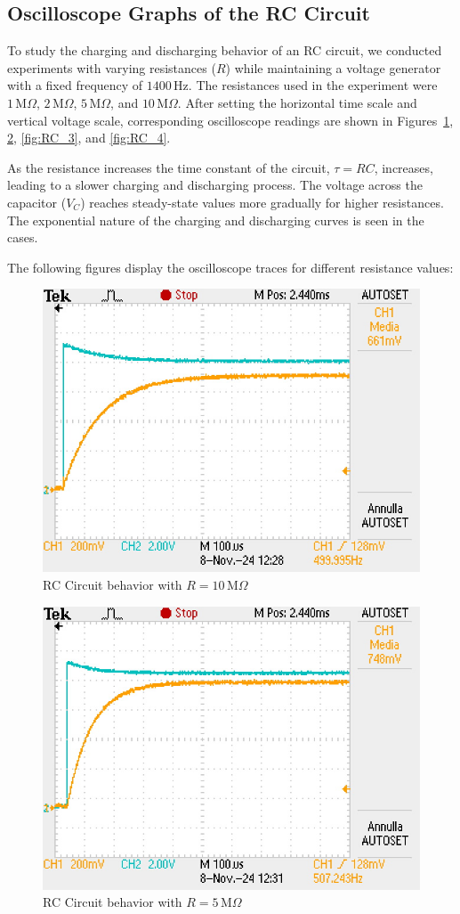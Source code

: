 \documentclass[notitlepage]{report}
\numberwithin{equation}{section}
\theoremstyle{plain}
\theoremstyle{definition}
\theoremstyle{remark}
\begin{document}
\subsection{Oscilloscope Graphs of the RC Circuit}

To study the charging and discharging behavior of an RC circuit, we conducted experiments with varying resistances (\(R\)) while maintaining a voltage generator with a fixed frequency of \(1400 \, \text{Hz}\). The resistances used in the experiment were \(1 \, \text{M}\Omega\), \(2 \, \text{M}\Omega\), \(5 \, \text{M}\Omega\), and \(10 \, \text{M}\Omega\). After setting the horizontal time scale and vertical voltage scale, corresponding oscilloscope readings are shown in Figures~\ref{fig:RC_1}, \ref{fig:RC_2}, \ref{fig:RC_3}, and \ref{fig:RC_4}.

As the resistance increases the time constant of the circuit, \(\tau = RC\), increases, leading to a slower charging and discharging process. The voltage across the capacitor (\(V_C\)) reaches steady-state values more gradually for higher resistances. The exponential nature of the charging and discharging curves is seen in the cases.

The following figures display the oscilloscope traces for different resistance values:
\begin{figure}[h!]
    \centering
    \includegraphics[width=0.4\linewidth]{figures/RC_graph_1.JPG}
    \caption{RC Circuit behavior with \(R = 10 \, \text{M}\Omega\)}
    \label{fig:RC_1}
\end{figure}

\begin{figure}[h!]
    \centering
    \includegraphics[width=0.4\linewidth]{figures/RC_graph_2.JPG}
    \caption{RC Circuit behavior with \(R = 5 \, \text{M}\Omega\)}
    \label{fig:RC_2}
\end{figure}
\end{document}
